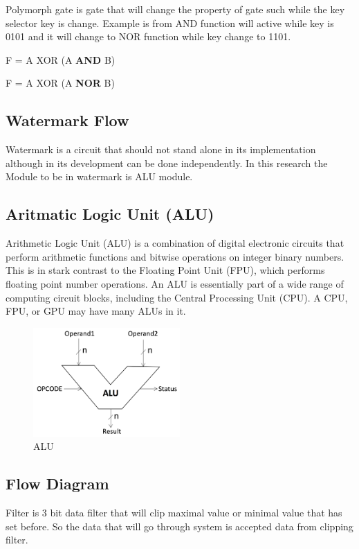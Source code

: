 \documentclass[10pt,journal,compsoc,letterpaper,final]{IEEEtran}
\begin{document}
Polymorph gate is gate that will change the property of gate such while the key selector key is change. Example is from AND function will active while key is 0101 and it will change to NOR function while key change to 1101.

\begin{center}
	F = A XOR (A \textbf{AND} B)
\end{center}

\begin{center}
	F = A XOR (A \textbf{NOR} B)
\end{center}

\subsection{Watermark Flow}

Watermark is a circuit that should not stand alone in its implementation although in its development can be done independently. In this research the Module to be in watermark is ALU module.

\subsection{Aritmatic Logic Unit (ALU)}
Arithmetic Logic Unit (ALU) is a combination of digital electronic circuits that perform arithmetic functions and bitwise operations on integer binary numbers. This is in stark contrast to the Floating Point Unit (FPU), which performs floating point number operations. An ALU is essentially part of a wide range of computing circuit blocks, including the Central Processing Unit (CPU). A CPU, FPU, or GPU may have many ALUs in it.

\begin{figure}
	\centering
	\includegraphics[width=0.5\textwidth]
	{images/alu.png}
	\caption{ALU}
	\label{alu}
\end{figure}

\subsection{Flow Diagram}
Filter is 3 bit data filter that will clip maximal value or minimal value that has set before. So the data that will go through system is accepted data from clipping filter.
\end{document}
